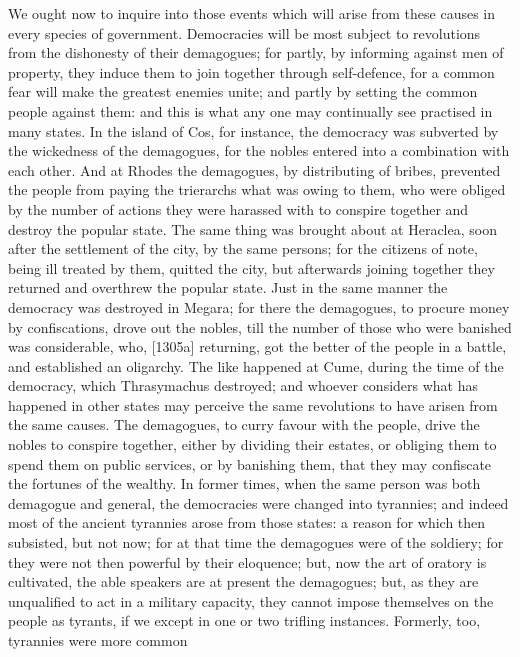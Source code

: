 
We ought now to inquire into those events which will arise from these
causes in every species of government. Democracies will be most subject to
revolutions from the dishonesty of their demagogues; for partly, by
informing against men of property, they induce them to join together
through self-defence, for a common fear will make the greatest enemies
unite; and partly by setting the common people against them: and this is
what any one may continually see practised in many states. In the island
of Cos, for instance, the democracy was subverted by the wickedness of the
demagogues, for the nobles entered into a combination with each other. And
at Rhodes the demagogues, by distributing of bribes, prevented the people
from paying the trierarchs what was owing to them, who were obliged by the
number of actions they were harassed with to conspire together and destroy
the popular state. The same thing was brought about at Heraclea, soon
after the settlement of the city, by the same persons; for the citizens of
note, being ill treated by them, quitted the city, but afterwards joining
together they returned and overthrew the popular state. Just in the same
manner the democracy was destroyed in Megara; for there the demagogues, to
procure money by confiscations, drove out the nobles, till the number of
those who were banished was considerable, who, [1305a] returning, got the
better of the people in a battle, and established an oligarchy. The like
happened at Cume, during the time of the democracy, which Thrasymachus
destroyed; and whoever considers what has happened in other states may
perceive the same revolutions to have arisen from the same causes. The
demagogues, to curry favour with the people, drive the nobles to conspire
together, either by dividing their estates, or obliging them to spend them
on public services, or by banishing them, that they may confiscate the
fortunes of the wealthy. In former times, when the same person was both
demagogue and general, the democracies were changed into tyrannies; and
indeed most of the ancient tyrannies arose from those states: a reason for
which then subsisted, but not now; for at that time the demagogues were of
the soldiery; for they were not then powerful by their eloquence; but, now
the art of oratory is cultivated, the able speakers are at present the
demagogues; but, as they are unqualified to act in a military capacity,
they cannot impose themselves on the people as tyrants, if we except in
one or two trifling instances. Formerly, too, tyrannies were more common
